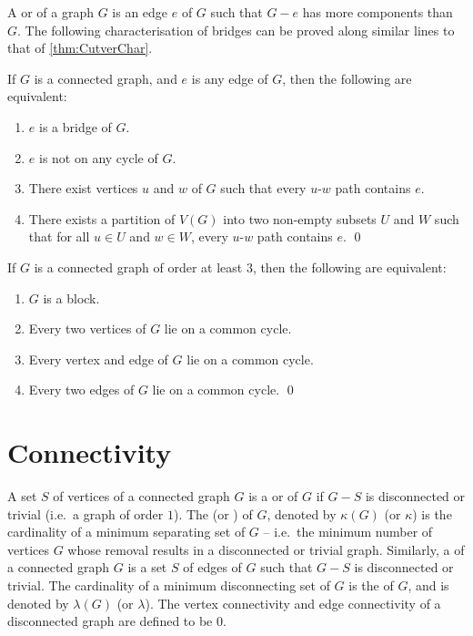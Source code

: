 A  or  of a graph $G$ is an edge $e$ of $G$ such that $G - e$ has more components than $G$. The following characterisation of bridges can be proved along similar lines to that of \cref{thm:CutverChar}.

\begin{Theorem}\label{thm:BridgeChar}
If $G$ is a connected graph, and $e$ is any edge of $G$, then the following are equivalent:
\begin{enumerate}[label=(\roman*)]
\item\label{it:BridgeChar1} $e$ is a bridge of $G$.
\item \label{it:BridgeChar2} $e$ is not on any cycle of $G$.
\item\label{it:BridgeChar3} There exist vertices $u$ and $w$ of $G$ such that every $u$-$w$ path contains $e$.
\item\label{it:BridgeChar4} There exists a partition of $V(G)$ into two non-empty subsets $U$ and $W$ such that for all $u \in U$ and $w \in W$, every $u$-$w$ path contains $e$. \qed
\end{enumerate}
\end{Theorem}

\begin{Theorem}\label{thm:BlockChar}
If $G$ is a connected graph of order at least $3$, then the following are equivalent:
\begin{enumerate}[label=(\roman*)]
\item\label{it:BlockChar1} $G$ is a block.
\item \label{it:BlockChar2} Every two vertices of $G$ lie on a common cycle.
\item\label{it:BlockChar3} Every vertex and edge of $G$ lie on a common cycle.
\item\label{it:BlockChar4} Every two edges of $G$ lie on a common cycle. \qed
\end{enumerate}
\end{Theorem}


\section{Connectivity}\label{sec:Connectivity}

A set $S$ of vertices of a connected graph $G$ is a  or  of $G$ if $G - S$ is disconnected or trivial (i.e.\ a graph of order $1$). The  (or ) of $G$, denoted by $\kappa(G)$ (or $\kappa$) is the cardinality of a minimum separating set of $G$ -- i.e.\ the minimum number of vertices $G$ whose removal results in a disconnected or trivial graph. Similarly, a  of a connected graph $G$ is a set $S$ of edges of $G$ such that $G - S$ is disconnected or trivial. The cardinality of a minimum disconnecting set of $G$ is the  of $G$, and is denoted by $\lambda(G)$ (or $\lambda$). The vertex connectivity and edge connectivity of a disconnected graph are defined to be $0$.

